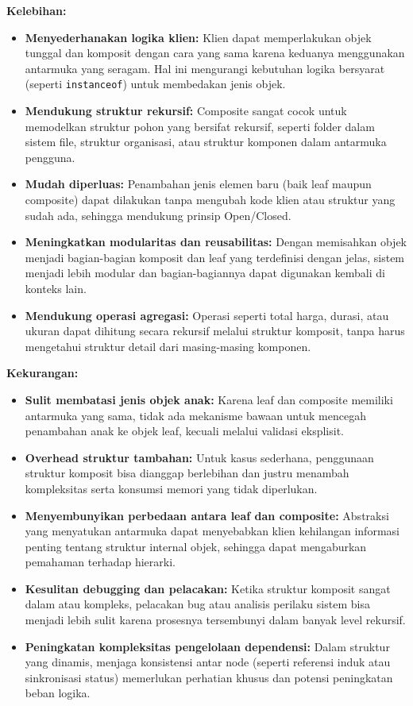 \textbf{Kelebihan:}
\begin{itemize}
	\item \textbf{Menyederhanakan logika klien:} Klien dapat memperlakukan objek tunggal dan komposit dengan cara yang sama karena keduanya menggunakan antarmuka yang seragam. Hal ini mengurangi kebutuhan logika bersyarat (seperti \texttt{instanceof}) untuk membedakan jenis objek.
	
	\item \textbf{Mendukung struktur rekursif:} Composite sangat cocok untuk memodelkan struktur pohon yang bersifat rekursif, seperti folder dalam sistem file, struktur organisasi, atau struktur komponen dalam antarmuka pengguna.
	
	\item \textbf{Mudah diperluas:} Penambahan jenis elemen baru (baik leaf maupun composite) dapat dilakukan tanpa mengubah kode klien atau struktur yang sudah ada, sehingga mendukung prinsip Open/Closed.
	
	\item \textbf{Meningkatkan modularitas dan reusabilitas:} Dengan memisahkan objek menjadi bagian-bagian komposit dan leaf yang terdefinisi dengan jelas, sistem menjadi lebih modular dan bagian-bagiannya dapat digunakan kembali di konteks lain.
	
	\item \textbf{Mendukung operasi agregasi:} Operasi seperti total harga, durasi, atau ukuran dapat dihitung secara rekursif melalui struktur komposit, tanpa harus mengetahui struktur detail dari masing-masing komponen.
\end{itemize}

\textbf{Kekurangan:}
\begin{itemize}
	\item \textbf{Sulit membatasi jenis objek anak:} Karena leaf dan composite memiliki antarmuka yang sama, tidak ada mekanisme bawaan untuk mencegah penambahan anak ke objek leaf, kecuali melalui validasi eksplisit.
	
	\item \textbf{Overhead struktur tambahan:} Untuk kasus sederhana, penggunaan struktur komposit bisa dianggap berlebihan dan justru menambah kompleksitas serta konsumsi memori yang tidak diperlukan.
	
	\item \textbf{Menyembunyikan perbedaan antara leaf dan composite:} Abstraksi yang menyatukan antarmuka dapat menyebabkan klien kehilangan informasi penting tentang struktur internal objek, sehingga dapat mengaburkan pemahaman terhadap hierarki.
	
	\item \textbf{Kesulitan debugging dan pelacakan:} Ketika struktur komposit sangat dalam atau kompleks, pelacakan bug atau analisis perilaku sistem bisa menjadi lebih sulit karena prosesnya tersembunyi dalam banyak level rekursif.
	
	\item \textbf{Peningkatan kompleksitas pengelolaan dependensi:} Dalam struktur yang dinamis, menjaga konsistensi antar node (seperti referensi induk atau sinkronisasi status) memerlukan perhatian khusus dan potensi peningkatan beban logika.
\end{itemize}

